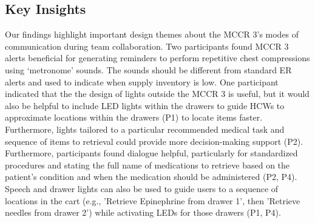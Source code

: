 \subsection{Key Insights}

Our findings highlight important design themes about the MCCR 3's modes of communication during team collaboration.
Two participants found MCCR 3 alerts beneficial for generating reminders to perform repetitive chest compressions using ‘metronome’ sounds. The sounds should be different from standard ER alerts and used to indicate when supply inventory is low.
One participant indicated that the the design of lights outside the MCCR 3 is useful, but it would also be helpful to include LED lights within the drawers to guide HCWs to approximate locations within the drawers (P1) to locate items faster. 
Furthermore, lights tailored to a particular recommended medical task and sequence of items to retrieval could provide more decision-making support (P2). 
Furthermore, participants found dialogue helpful, particularly for standardized procedures and stating the full name of medications to retrieve based on the patient's condition and when the medication should be administered (P2, P4).
Speech and drawer lights can also be used to guide users to a sequence of locations in the cart (e.g., 'Retrieve Epinephrine from drawer 1', then 'Retrieve needles from drawer 2') while activating LEDs for those drawers (P1, P4).



